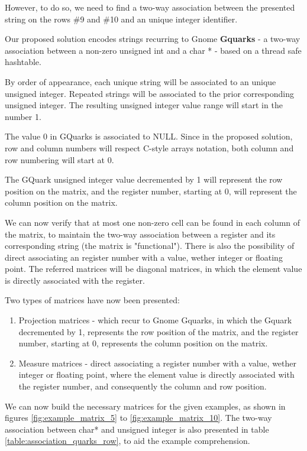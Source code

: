 However, to do so, we need to find a two-way association between the presented string on the rows \#9 and \#10 and an unique integer identifier. 

Our proposed solution encodes strings recurring to Gnome \textbf{Gquarks} - a two-way association between a non-zero unsigned int and a char * - based on a thread safe hashtable. \par 

By order of appearance, each unique string will be associated to an unique unsigned integer. Repeated strings will be associated to the prior corresponding unsigned integer. The resulting unsigned integer value range will start in the number 1. 

The value 0 in GQuarks is associated to NULL. 
Since in the proposed solution, row and column numbers will respect C-style arrays notation, both column and row numbering will start at 0. 

The GQuark unsigned integer value decremented by 1  will represent the row position on the matrix, and the register number, starting at 0, will represent the column position on the matrix. \par 
We can now verify that at most one non-zero cell can be found in each column of the matrix, to maintain the two-way association between a register and its corresponding string (the matrix is "functional"). There is also the possibility of direct associating an register number with a value, wether integer or floating point. The referred matrices will be diagonal matrices, in which the element value is directly associated with the register.\par 
Two types of matrices have now been presented:
\label{definition_matrices}
\begin{enumerate}
\item Projection matrices - which recur to Gnome Gquarks, in which the Gquark decremented by 1, represents the row position of the matrix, and the register number, starting at 0,  represents the column position on the matrix.
\item Measure matrices -  direct associating a register number with a value, wether integer or floating point,  where the element value is directly associated with the register number, and consequently the column and row position.
\end{enumerate}
 
We can now build the necessary matrices for the given examples, as shown in figures  \ref{fig:example_matrix_5} to \ref{fig:example_matrix_10}. The two-way association between char* and unsigned integer is also presented in table \ref{table:association_quarks_row}, to aid the example comprehension. 

